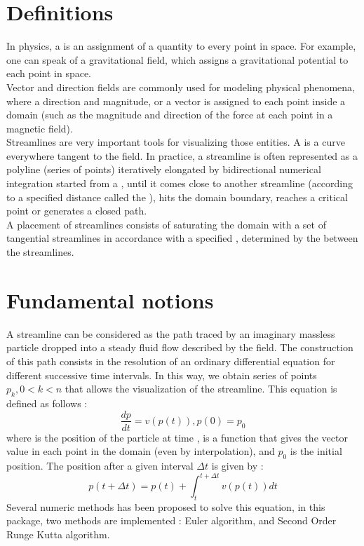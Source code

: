 \section{Definitions}
\label{Section_2D_Streamlines_Definitions}
In physics, a  is an assignment of a quantity to every point in
space. For example, one can speak of a gravitational field, which assigns a
gravitational potential to each point in space.\\
Vector and direction fields are commonly used for modeling physical phenomena,
where a direction and magnitude,
or a vector is assigned to each point inside a domain (such as the magnitude and
direction of the force at each point in a magnetic field).\\
Streamlines are very important tools for visualizing those entities. A
 is a curve everywhere tangent to the field. In practice, 
a streamline is often represented as a polyline (series of points) iteratively elongated by 
bidirectional numerical integration started from a , until 
it comes close to another streamline (according to a specified distance called 
the ), hits the domain boundary, reaches a 
critical point or generates a closed path.\\
A  placement of streamlines consists of saturating the domain with a set of tangential streamlines  in accordance with a specified , determined by the  between the streamlines.

\section{Fundamental notions}
\label{Section_2D_Streamlines_Fundamental_notions}
A streamline can be considered as the path traced by an imaginary massless particle dropped into a steady fluid flow described by the field. The construction of this path consists in the resolution of an ordinary differential equation for different successive time intervals. In this way, we obtain series of points $p_k, 0<k<n$ that allows the visualization of the streamline.
This equation is defined as follows : $$\frac{dp}{dt} = v(p(t)), p(0) = p_0$$ where  is the position of the particle at time ,  is a function that gives the vector value in each point in the domain (even by interpolation), and $p_0$ is the initial position.
The position after a given interval $\Delta t$ is given by : $$p(t + \Delta t) = p(t) + \int_t^{t+\Delta t} v(p(t)) dt$$
Several numeric methods has been proposed to solve this equation, in this package, two methods are implemented : Euler algorithm, and Second Order Runge Kutta algorithm.

